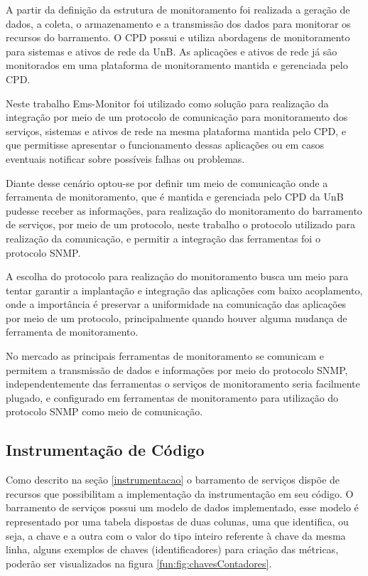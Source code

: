 A partir da definição da estrutura de monitoramento foi realizada a geração de dados, a coleta, o armazenamento e a transmissão dos dados para monitorar os recursos do barramento. O \acrshort{CPD} possui e utiliza abordagens de monitoramento para sistemas e ativos de rede da \acrshort{UnB}. As aplicações e ativos de rede já são monitorados em uma plataforma de monitoramento mantida e gerenciada pelo \acrshort{CPD}. 

Neste trabalho Ems-Monitor foi utilizado como solução para realização da integração por meio de um protocolo de comunicação para monitoramento dos serviços, sistemas e ativos de rede na mesma plataforma mantida pelo \acrshort{CPD}, e que permitisse apresentar o funcionamento dessas aplicações ou em casos eventuais notificar sobre possíveis falhas ou problemas. 

Diante desse cenário optou-se por definir um meio de comunicação onde a ferramenta de monitoramento, que é mantida e gerenciada pelo \acrshort{CPD} da \acrshort{UnB} pudesse receber as informações, para realização do monitoramento do barramento de serviços, por meio de um protocolo, neste trabalho o protocolo utilizado para realização da comunicação, e permitir a integração das ferramentas foi o protocolo \acrshort{SNMP}. 

A escolha do protocolo para realização do monitoramento busca um meio para tentar garantir a implantação e integração das aplicações com baixo acoplamento, onde a importância é preservar a uniformidade na comunicação das aplicações por meio de um protocolo, principalmente quando houver alguma mudança de ferramenta de monitoramento. 

No mercado as principais ferramentas de monitoramento se comunicam e permitem a transmissão de dados e informações por meio do protocolo \acrshort{SNMP}, independentemente das ferramentas o serviços de monitoramento seria facilmente plugado, e configurado em ferramentas de monitoramento para utilização do protocolo \acrshort{SNMP} como meio de comunicação.      

\subsection{Instrumentação de Código}
\label{instrumentacaoErlangms}

Como descrito na seção \ref{instrumentacao} o barramento de serviços dispõe de recursos que possibilitam a implementação da instrumentação em seu código. O barramento de serviços possui  um modelo de dados implementado, esse modelo é representado por uma tabela dispostas de duas colunas, uma que identifica, ou seja, a chave e a outra com o valor do tipo inteiro referente à chave da mesma linha, alguns exemplos de chaves (identificadores) para criação das métricas, poderão ser visualizados na figura \ref{fun:fig:chavesContadores}. 

